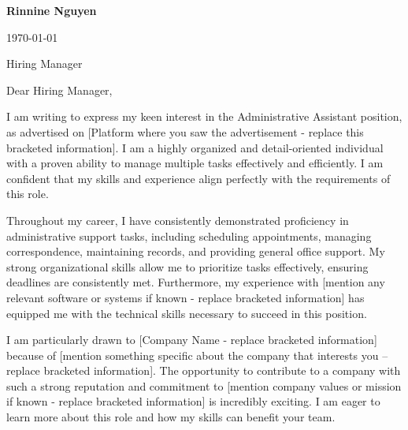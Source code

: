 \documentclass[letterpaper,11pt]{article}
\begin{document}
\textbf{Rinnine Nguyen} \\
\vspace{20pt}

\today \\
\vspace{20pt}

Hiring Manager \\
\vspace{20pt}

Dear Hiring Manager, \\
\vspace{10pt}

I am writing to express my keen interest in the Administrative Assistant position, as advertised on [Platform where you saw the advertisement -  replace this bracketed information].  I am a highly organized and detail-oriented individual with a proven ability to manage multiple tasks effectively and efficiently. I am confident that my skills and experience align perfectly with the requirements of this role.

\vspace{10pt}

Throughout my career, I have consistently demonstrated proficiency in administrative support tasks, including scheduling appointments, managing correspondence, maintaining records, and providing general office support.  My strong organizational skills allow me to prioritize tasks effectively, ensuring deadlines are consistently met.  Furthermore, my experience with [mention any relevant software or systems if known - replace bracketed information] has equipped me with the technical skills necessary to succeed in this position.

\vspace{10pt}

I am particularly drawn to [Company Name - replace bracketed information] because of [mention something specific about the company that interests you – replace bracketed information]. The opportunity to contribute to a company with such a strong reputation and commitment to [mention company values or mission if known - replace bracketed information] is incredibly exciting.  I am eager to learn more about this role and how my skills can benefit your team.
\end{document}
